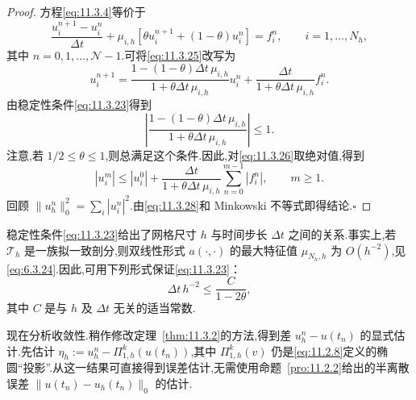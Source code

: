 \begin{proof}
方程\eqref{eq:11.3.4}等价于
\begin{equation}\label{eq:11.3.25}
  \frac{u_i^{n+1}-u_i^n}{\Delta t}
      +\mu_{i,h}[\theta u_i^{n+1}+(1-\theta)u_i^n]=f_i^n,\qquad i=1,\ldots,N_h,
\end{equation}
其中 \(n=0,1,\ldots,\mathcal N-1\).可将\eqref{eq:11.3.25}改写为
\begin{equation}\label{eq:11.3.26}
  u_i^{n+1}
      =\frac{1-(1-\theta)\Delta t\,\mu_{i,h}}{1+\theta\Delta t\,\mu_{i,h}}u_i^n
        +\frac{\Delta t}{1+\theta\Delta t\,\mu_{i,h}}f_i^n .
\end{equation}
由稳定性条件\eqref{eq:11.3.23}得到
\begin{equation}\label{eq:11.3.27}
  \left|\frac{1-(1-\theta)\Delta t\,\mu_{i,h}}{1+\theta\Delta t\,\mu_{i,h}}\right|\le1.
\end{equation}
注意,若 \(1/2\le\theta\le1\),则总满足这个条件.因此,对\eqref{eq:11.3.26}取绝对值,得到
\begin{equation}\label{eq:11.3.28}
  |u_i^m|\le|u_i^0|+\frac{\Delta t}{1+\theta\Delta t\,\mu_{i,h}}
        \sum_{n=0}^{m-1}|f_i^n|,\qquad m\ge1.
\end{equation}
回顾 \(\|u_h^n\|_0^2=\sum_i|u_i^n|^2\).由\eqref{eq:11.3.28}和 Minkowski 不等式即得结论.\hfill\(\square\)
\end{proof}

稳定性条件\eqref{eq:11.3.23}给出了网格尺寸 \(h\) 与时间步长 \(\Delta t\) 之间的关系.事实上,若 \(\mathcal T_h\) 是一族拟一致剖分,则双线性形式 \(a(\cdot,\cdot)\) 的最大特征值 \(\mu_{N_h,h}\) 为 \(O(h^{-2})\),见\eqref{eq:6.3.24}.因此,可用下列形式保证\eqref{eq:11.3.23}：
\begin{equation}\label{eq:11.3.29}
  \Delta t\,h^{-2}\le\frac{C}{1-2\theta},
\end{equation}
其中 \(C\) 是与 \(h\) 及 \(\Delta t\) 无关的适当常数.

现在分析收敛性.稍作修改定理~\ref{thm:11.3.2}的方法,得到差 \(u_h^n-u(t_n)\) 的显式估计.先估计 \(\eta_h:=u_h^n-\Pi_{1,h}^k(u(t_n))\),其中 \(\Pi_{1,h}^k(v)\) 仍是\eqref{eq:11.2.8}定义的椭圆“投影”.从这一结果可直接得到误差估计,无需使用命题~\ref{pro:11.2.2}给出的半离散误差 \(\|u(t_n)-u_h(t_n)\|_0\) 的估计.

